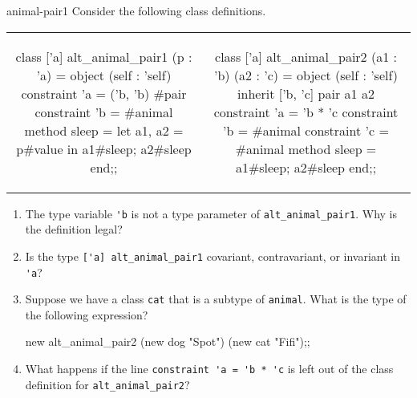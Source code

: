 \begin{exercise}{animal-pair1}
Consider the following class definitions.

\begin{center}
\begin{tabular}{cc}
\begin{minipage}[t]{2.8in}
\begin{ocamllisting}
class ['a] alt_animal_pair1 (p : 'a) =
  object (self : 'self)
    constraint 'a = ('b, 'b) #pair
    constraint 'b = #animal
    method sleep =
      let a1, a2 = p#value in
      a1#sleep; a2#sleep
  end;;
\end{ocamllisting}
\end{minipage}
&
\begin{minipage}[t]{2.2in}
\begin{ocamllisting}
class ['a] alt_animal_pair2
  (a1 : 'b) (a2 : 'c) =
  object (self : 'self)
    inherit ['b, 'c] pair a1 a2
    constraint 'a = 'b * 'c
    constraint 'b = #animal
    constraint 'c = #animal
    method sleep =
      a1#sleep; a2#sleep
  end;;
\end{ocamllisting}
\end{minipage}
\end{tabular}
\end{center}
%
\begin{enumerate}
\item

The type variable \hbox{\lstinline$'b$} is not a type parameter
of \hbox{\lstinline$alt_animal_pair1$}.  Why is the definition legal?

\item

Is the type \hbox{\lstinline$['a] alt_animal_pair1$} covariant, contravariant, or invariant in \hbox{\lstinline$'a$}?

\item

Suppose we have a class \hbox{\lstinline$cat$} that is a subtype of \hbox{\lstinline$animal$}.
What is the type of the following expression?

\begin{ocaml}
new alt_animal_pair2 (new dog "Spot") (new cat "Fifi");;
\end{ocaml}

\item

What happens if the line \hbox{\lstinline$constraint 'a = 'b * 'c$} is left out
of the class definition for \hbox{\lstinline$alt_animal_pair2$}?


\end{enumerate}
\end{exercise}
